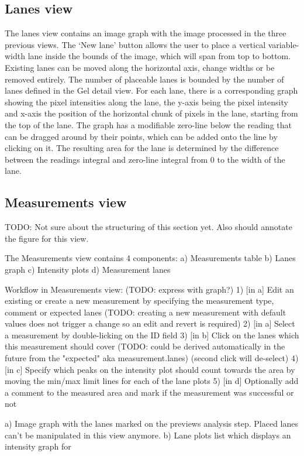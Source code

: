 \subsection{Lanes view}
The lanes view contains an image graph with the image processed in the three previous views. The ‘New lane’ button allows the user to place a vertical variable-width lane inside the bounds of the image, which will span from top to bottom. Existing lanes can be moved along the horizontal axis, change widths or be removed entirely. The number of placeable lanes is bounded by the number of lanes defined in the Gel detail view. 
For each lane, there is a corresponding graph showing the pixel intensities along the lane, the y-axis being the pixel intensity and x-axis the position of the horizontal chunk of pixels in the lane, starting from the top of the lane. The graph has a modifiable zero-line below the reading that can be dragged around by their points, which can be added onto the line by clicking on it. The resulting area for the lane is determined by the difference between the readings integral and zero-line integral from 0 to the width of the lane.

\subsection{Measurements view}
TODO: Not sure about the structuring of this section yet. Also should annotate the figure for this view.

The Measurements view contains 4 components:
a) Measurements table
b) Lanes graph
c) Intensity plots
d) Measurement lanes

Workflow in Measurements view: (TODO: express with graph?)
1) [in a] Edit an existing or create a new measurement by specifying the measurement type, comment or expected lanes (TODO: creating a new measurement with default values does not trigger a change so an edit and revert is required)
2) [in a] Select a measurement by double-licking on the ID field
3) [in b] Click on the lanes which this measurement should cover (TODO: could be derived automatically in the future from the "expected" aka measurement.lanes) (second click will de-select)
4) [in c] Specify which peaks on the intensity plot should count towards the area by moving the min/max limit lines for each of the lane plots
5) [in d] Optionally add a comment to the measured area and mark if the measurement was successful or not 


a) Image graph with the lanes marked on the previews analysis step. Placed lanes can't be manipulated in this view anymore.
b) Lane plots list which displays an intensity graph for 



